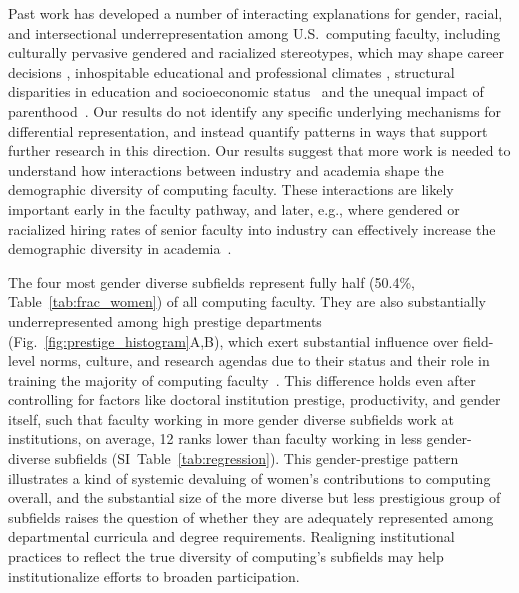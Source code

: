 \documentclass[reprint, twocolumn, aps, nofootinbib, superscriptaddress, longbibliography]{revtex4-1}
\begin{document}
Past work has developed a number of interacting explanations for gender, racial, and intersectional underrepresentation among U.S.~computing faculty, including culturally pervasive gendered and racialized stereotypes, which may shape career decisions \cite{adya2005early, trauth2016influence, leslie2015expectations}, inhospitable educational and professional climates \cite{griffin2011re, slay2019bait, eagan2015stressing, marx2002female,shapiro2011major,witteman2019gender,clark2005women, national2018sexual}, structural disparities in education and socioeconomic status~\cite{conley2010being,edbuild2019billion,morgan2021socioeconomic,grissom2015discretion, lucas2002sociodemographic} and the unequal impact of parenthood~\cite{morgan2021unequal,hawks1998women,cech2019changing,goulden2009staying}. 
Our results do not identify any specific underlying mechanisms for differential representation, and instead quantify patterns in ways that support further research in this direction. Our results suggest that more work is needed to understand how interactions between industry and academia shape the demographic diversity of computing faculty. These interactions are likely important early in the faculty pathway, and later, e.g., where gendered or racialized hiring rates of senior faculty into industry can effectively increase the demographic diversity in academia~\cite{jurowetzki2021privatization}. 

The four most gender diverse subfields represent fully half (50.4\%, Table~\ref{tab:frac_women}) of all computing faculty. They are also substantially underrepresented among high prestige departments (Fig.~\ref{fig:prestige_histogram}A,B), which exert substantial influence over field-level norms, culture, and research agendas due to their status and their role in training the majority of computing faculty~\cite{clauset2015systematic, morgan2018prestige}. This difference holds even after controlling for factors like doctoral institution prestige, productivity, and gender itself, such that faculty working in more gender diverse subfields work at institutions, on average, 12 ranks lower than faculty working in less gender-diverse subfields (SI~Table~\ref{tab:regression}). This gender-prestige pattern illustrates a kind of systemic devaluing of women's contributions to computing overall, and the substantial size of the more diverse but less prestigious group of subfields raises the question of whether they are adequately represented among departmental curricula and degree requirements. Realigning institutional practices to reflect the true diversity of computing's subfields may help institutionalize efforts to broaden participation. 
\end{document}
